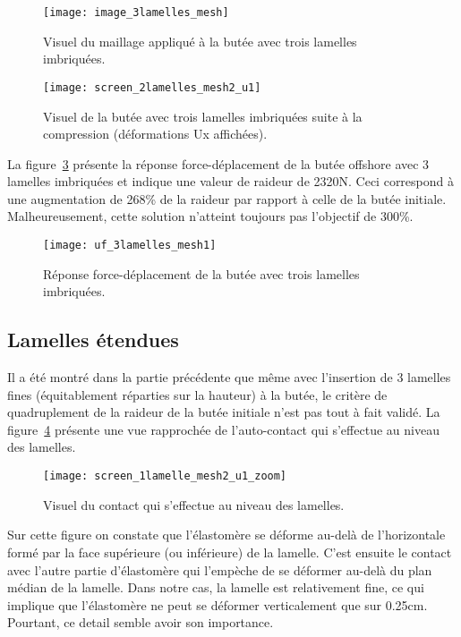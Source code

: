 ﻿ \documentclass{article}
\begin{document}
\begin{figure}[!h]
	\centering
	\texttt{[image: image\_3lamelles\_mesh]}
	\caption{Visuel du maillage appliqué à la butée avec trois lamelles imbriquées.}
	\label{fig13}
\end{figure}

\begin{figure}[!h]
	\centering
	\texttt{[image: screen\_2lamelles\_mesh2\_u1]}
	\caption{Visuel de la butée avec trois lamelles imbriquées suite à la compression (déformations Ux affichées).}
	\label{fig14}
\end{figure}

La figure~\ref{fig15} présente la réponse force-déplacement de la butée offshore avec 3 lamelles imbriquées et indique une valeur de raideur de 2320N. Ceci correspond à une augmentation de 268\% de la raideur par rapport à celle de la butée initiale. Malheureusement, cette solution n'atteint toujours pas l'objectif de 300\%.
 
\begin{figure}[!h]
	\centering
	\texttt{[image: uf\_3lamelles\_mesh1]}
	\caption{Réponse force-déplacement de la butée avec trois lamelles imbriquées.}
	\label{fig15}
\end{figure}

\subsection{Lamelles étendues}
Il a été montré dans la partie précédente que même avec l'insertion de 3 lamelles fines (équitablement réparties sur la hauteur) à la butée, le critère de quadruplement de la raideur de la butée initiale n'est pas tout à fait validé. La figure~\ref{fig16} présente une vue rapprochée de l'auto-contact qui s'effectue au niveau des lamelles.

\begin{figure}[!h]
	\centering
	\texttt{[image: screen\_1lamelle\_mesh2\_u1\_zoom]}
	\caption{Visuel du contact qui s'effectue au niveau des lamelles.}
	\label{fig16}
\end{figure}

Sur cette figure on constate que l'élastomère se déforme au-delà de l'horizontale formé par la face supérieure (ou inférieure) de la lamelle. C'est ensuite le contact avec l'autre partie d'élastomère qui l'empèche de se déformer au-delà du plan médian de la lamelle. Dans notre cas, la lamelle est relativement fine, ce qui implique que l'élastomère ne peut se déformer verticalement que sur 0.25cm. Pourtant, ce detail semble avoir son importance.
\end{document}
